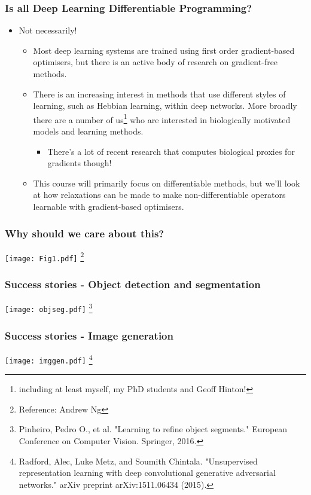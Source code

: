 \documentclass[\beamerclass]{beamer}
\newcommand\blfootnote[1]{%
  \begingroup
  \renewcommand\thefootnote{}\footnote{#1}%
  \addtocounter{footnote}{-1}%
  \endgroup
}
\begin{document}
\begin{frame}
\frametitle{Is all Deep Learning Differentiable Programming?}
\begin{itemize}
	\item Not necessarily!
	\begin{itemize}
		\item<+-> Most deep learning systems are trained using first order gradient-based optimisers, but there is an active body of research on gradient-free methods.
		\item<+-> There is an increasing interest in methods that use different styles of learning, such as Hebbian learning, within deep networks. More broadly there are a number of us\footnote{including at least myself, my PhD students and Geoff Hinton!} who are interested in biologically motivated models and learning methods.
		\begin{itemize}
			\item<+-> There's a lot of recent research that computes biological proxies for gradients though!
		\end{itemize}

		\item<+-> This course will primarily focus on differentiable methods, but we'll look at how relaxations can be made to make non-differentiable operators learnable with gradient-based optimisers.
	\end{itemize}
\end{itemize}
\end{frame}

\begin{frame}
	\frametitle{Why should we care about this?}
	\centering \texttt{[image: Fig1.pdf]}\blfootnote{Reference: Andrew Ng}
\end{frame}

\begin{frame}
	\frametitle{Success stories - Object detection and segmentation}
	\centering \texttt{[image: objseg.pdf]}\blfootnote{Pinheiro, Pedro O., et al. "Learning to refine object segments." European Conference on Computer Vision. Springer, 2016.}
\end{frame}

\begin{frame}
	\frametitle{Success stories - Image generation}
	\centering \texttt{[image: imggen.pdf]}\blfootnote{Radford, Alec, Luke Metz, and Soumith Chintala. "Unsupervised representation learning with deep convolutional generative adversarial networks." arXiv preprint arXiv:1511.06434 (2015).}
\end{frame}
\end{document}
